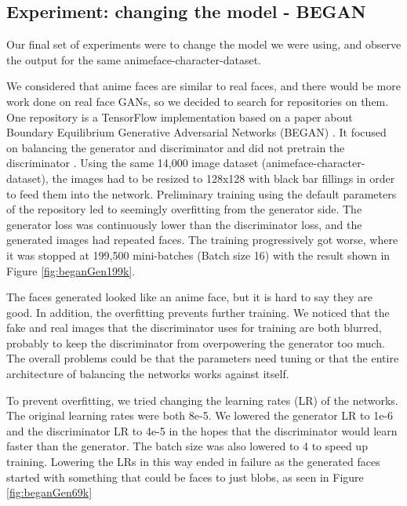 \documentclass{article} %
\begin{document}
\subsection{Experiment: changing the model - BEGAN}
Our final set of experiments were to change the model we were using, and observe the output for the same animeface-character-dataset.

We considered that anime faces are similar to real faces, and there would be more work done on real face GANs, so we decided to search for repositories on them. One repository is a TensorFlow implementation based on a paper about Boundary Equilibrium Generative Adversarial Networks (BEGAN) \cite{kimBEGAN}. It focused on balancing the generator and discriminator and did not pretrain the discriminator \cite{paperBEGAN}. Using the same 14,000 image dataset (animeface-character-dataset), the images had to be resized to 128x128 with black bar fillings in order to feed them into the network. Preliminary training using the default parameters of the repository led to seemingly overfitting from the generator side. The generator loss was continuously lower than the discriminator loss, and the generated images had repeated faces. The training progressively got worse, where it was stopped at 199,500 mini-batches (Batch size 16) with the result shown in Figure \ref{fig:beganGen199k}.


The faces generated looked like an anime face, but it is hard to say they are good.  In addition, the overfitting prevents further training. We noticed that the fake and real images that the discriminator uses for training are both blurred, probably to keep the discriminator from overpowering the generator too much. The overall problems could be that the parameters need tuning or that the entire architecture of balancing the networks works against itself.

To prevent overfitting, we tried changing the learning rates (LR) of the networks. The original learning rates were both 8e-5. We lowered the generator LR to 1e-6 and the discriminator LR to 4e-5 in the hopes that the discriminator would learn faster than the generator. The batch size was also lowered to 4 to speed up training. Lowering the LRs in this way ended in failure as the generated faces started with something that could be faces to just blobs, as seen in Figure \ref{fig:beganGen69k}
\end{document}

